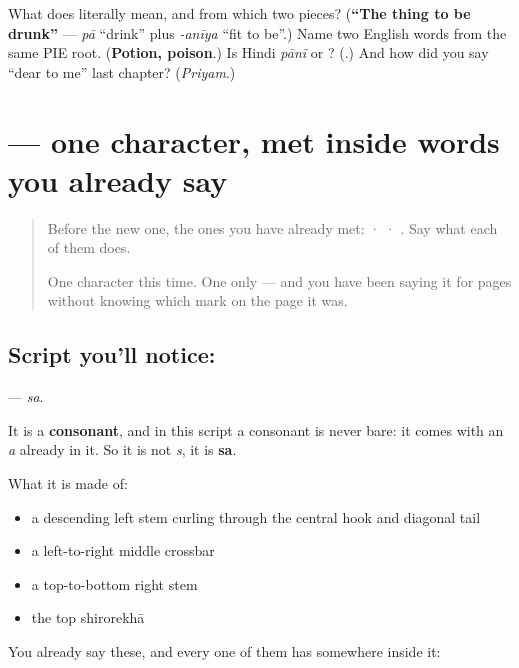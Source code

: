 \begin{tcolorbox}[breakable,colback=teal!4,colframe=teal!35!black,title={Before you move on}]
What does \textbf{} literally mean, and from which two pieces? (\textbf{\textquotedblleft{}The thing to be drunk\textquotedblright{}} — \emph{pā} \textquotedblleft{}drink\textquotedblright{} plus \emph{-anīya} \textquotedblleft{}fit to be\textquotedblright{}.) Name two English words from the same PIE root. (\textbf{Potion, poison}.) Is Hindi \emph{pānī}  or ? (\textbf{}.) And how did you say \textquotedblleft{}dear to me\textquotedblright{} last chapter? (\emph{Priyam}.)
\end{tcolorbox}
\section[\texorpdfstring{\sk{स} (sa)}{स (sa)}]{ — one character, met inside words you already say}

\label{lesson:SA-S108-letter-sa}



\begin{quote}
Before the new one, the ones you have already met:  ·  · . Say what each of them does.

One character this time. One only — and you have been saying it for pages without knowing which mark on the page it was.
\end{quote}

\subsection*{Script you'll notice: }
\textbf{} — \emph{sa}.

It is a \textbf{consonant}, and in this script a consonant is never bare: it comes with an \emph{a} already in it. So it is not \emph{s}, it is \textbf{sa}.

What it is made of:

\begin{itemize}
\raggedright
  \item a descending left stem curling through the central hook and diagonal tail
  \item a left-to-right middle crossbar
  \item a top-to-bottom right stem
  \item the top shirorekhā
\end{itemize}

You already say these, and every one of them has  somewhere inside it:

